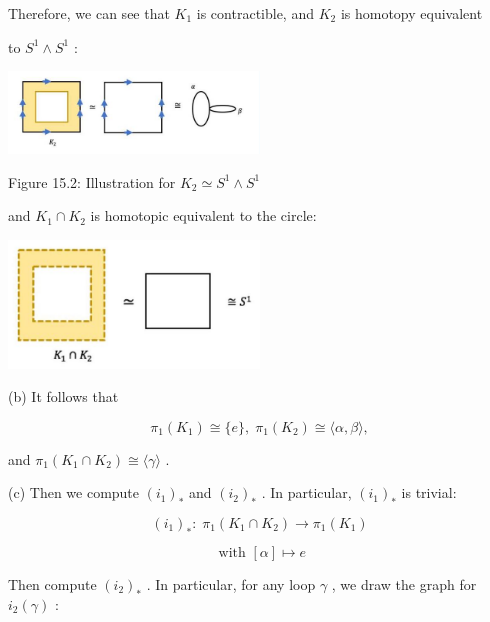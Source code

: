 Therefore, we can see that \({K}_{1}\) is contractible, and \({K}_{2}\) is homotopy equivalent

to \({S}^{1} \land  {S}^{1}\) :

\begin{center}
\includegraphics[max width=0.5\textwidth]{images/bo_d2bcsrref24c73avs720_152_507_433_658_216_0.jpg}
\end{center}
\hspace*{3em} 

Figure 15.2: Illustration for \({K}_{2} \simeq  {S}^{1} \land  {S}^{1}\)

and \({K}_{1} \cap  {K}_{2}\) is homotopic equivalent to the circle:

\begin{center}
\includegraphics[max width=0.5\textwidth]{images/bo_d2bcsrref24c73avs720_152_532_877_606_310_0.jpg}
\end{center}
\hspace*{3em} 

(b) It follows that

\[
{\pi }_{1}\left( {K}_{1}\right)  \cong  \{ e\} ,\;{\pi }_{1}\left( {K}_{2}\right)  \cong  \langle \alpha ,\beta \rangle ,
\]

and \({\pi }_{1}\left( {{K}_{1} \cap  {K}_{2}}\right)  \cong  \langle \gamma \rangle\) .

(c) Then we compute \({\left( {i}_{1}\right) }_{ * }\) and \({\left( {i}_{2}\right) }_{ * }\) . In particular, \({\left( {i}_{1}\right) }_{ * }\) is trivial:

\[
{\left( {i}_{1}\right) }_{ * } : \;{\pi }_{1}\left( {{K}_{1} \cap  {K}_{2}}\right)  \rightarrow  {\pi }_{1}\left( {K}_{1}\right)
\]

\[
\text{ with }\left\lbrack  \alpha \right\rbrack   \mapsto  e
\]

Then compute \({\left( {i}_{2}\right) }_{ * }\) . In particular, for any loop \(\gamma\) , we draw the graph for \({i}_{2}\left( \gamma \right)\) :

